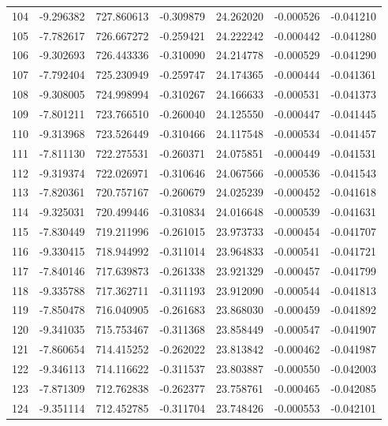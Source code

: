 \begin{tabular}{rrrrrrr}
 104 &  -9.296382 &  727.860613 & -0.309879 &   24.262020 &   -0.000526 & -0.041210 \\
 105 &  -7.782617 &  726.667272 & -0.259421 &   24.222242 &   -0.000442 & -0.041280 \\
 106 &  -9.302693 &  726.443336 & -0.310090 &   24.214778 &   -0.000529 & -0.041290 \\
 107 &  -7.792404 &  725.230949 & -0.259747 &   24.174365 &   -0.000444 & -0.041361 \\
 108 &  -9.308005 &  724.998994 & -0.310267 &   24.166633 &   -0.000531 & -0.041373 \\
 109 &  -7.801211 &  723.766510 & -0.260040 &   24.125550 &   -0.000447 & -0.041445 \\
 110 &  -9.313968 &  723.526449 & -0.310466 &   24.117548 &   -0.000534 & -0.041457 \\
 111 &  -7.811130 &  722.275531 & -0.260371 &   24.075851 &   -0.000449 & -0.041531 \\
 112 &  -9.319374 &  722.026971 & -0.310646 &   24.067566 &   -0.000536 & -0.041543 \\
 113 &  -7.820361 &  720.757167 & -0.260679 &   24.025239 &   -0.000452 & -0.041618 \\
 114 &  -9.325031 &  720.499446 & -0.310834 &   24.016648 &   -0.000539 & -0.041631 \\
 115 &  -7.830449 &  719.211996 & -0.261015 &   23.973733 &   -0.000454 & -0.041707 \\
 116 &  -9.330415 &  718.944992 & -0.311014 &   23.964833 &   -0.000541 & -0.041721 \\
 117 &  -7.840146 &  717.639873 & -0.261338 &   23.921329 &   -0.000457 & -0.041799 \\
 118 &  -9.335788 &  717.362711 & -0.311193 &   23.912090 &   -0.000544 & -0.041813 \\
 119 &  -7.850478 &  716.040905 & -0.261683 &   23.868030 &   -0.000459 & -0.041892 \\
 120 &  -9.341035 &  715.753467 & -0.311368 &   23.858449 &   -0.000547 & -0.041907 \\
 121 &  -7.860654 &  714.415252 & -0.262022 &   23.813842 &   -0.000462 & -0.041987 \\
 122 &  -9.346113 &  714.116622 & -0.311537 &   23.803887 &   -0.000550 & -0.042003 \\
 123 &  -7.871309 &  712.762838 & -0.262377 &   23.758761 &   -0.000465 & -0.042085 \\
 124 &  -9.351114 &  712.452785 & -0.311704 &   23.748426 &   -0.000553 & -0.042101 \\

\end{tabular}
